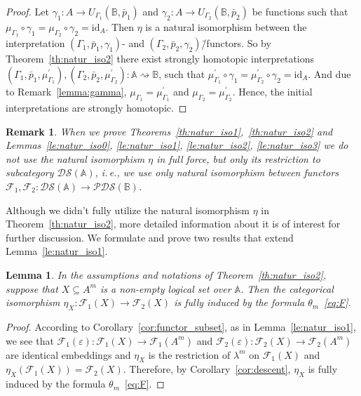 \documentclass[12pt]{article}
\newtheorem{lemma}{Lemma}
\newtheorem{remark}{Remark}
\theoremstyle{definition}
\def\MA{{\mathbb{A}}}
\def\MB{{\mathbb{B}}}
\def\F{{\mathcal{F}}}
\def\PDS{{\mathcal{PDS}}}
\def\DS{{\mathcal{DS}}}
\def\id{{\mathrm{id}}}
\begin{document}
\begin{proof}
Let $\gamma_1\colon A\to U_{\Gamma_1}(\MB,\bar p_1)$ and $\gamma_2\colon A\to U_{\Gamma_2}(\MB,\bar p_2)$ be functions such that $\mu_{\Gamma_1}\circ\gamma_1=\mu_{\Gamma_2}\circ\gamma_2=\id_A$. Then $\eta$ is a natural isomorphism between the interpretation $(\Gamma_1,\bar p_1,\gamma_1)$- and $(\Gamma_2,\bar p_2,\gamma_2)$\=/functors. So by Theorem~\ref{th:natur_iso2} there exist strongly homotopic interpretations $(\Gamma_1,\bar p_1,\mu^\prime_{\Gamma_1}),(\Gamma_2,\bar p_2,\mu^\prime_{\Gamma_2})\colon \MA \rightsquigarrow \MB$, such that $\mu^\prime_{\Gamma_1} \circ\gamma_1=\mu^\prime_{\Gamma_2} \circ\gamma_2=\id_A$. And due to  Remark~\ref{lemma:gamma}, $\mu_{\Gamma_1}=\mu^\prime_{\Gamma_1}$ and $\mu_{\Gamma_2}=\mu^\prime_{\Gamma_2}$. Hence, the initial interpretations are strongly homotopic.  
\end{proof}

\begin{remark}\label{remark:DS}
When we prove Theorems~\ref{th:natur_iso1},~\ref{th:natur_iso2} and Lemmas~\ref{le:natur_iso0}, \ref{le:natur_iso1}, \ref{le:natur_iso2}, \ref{le:natur_iso3} we do not use the natural isomorphism $\eta$ in full force, but only its restriction to subcategory $\DS(\MA)$, i.\,e., we use only natural isomorphism between functors $\F_1,\F_2\colon \DS(\MA)\to\PDS(\MB)$.
\end{remark}

Although we didn't fully utilize the natural isomorphism $\eta$ in Theorem~\ref{th:natur_iso2}, more detailed information about it is of interest for further discussion. We formulate and prove two results that extend Lemma~\ref{le:natur_iso1}.

\begin{lemma}\label{le:natur_iso4}
In the assumptions and notations of Theorem~\ref{th:natur_iso2}, suppose that $X\subseteq A^m$ is a non-empty logical set over $\MA$. Then the categorical isomorphism $\eta_X\colon \F_1(X)\to \F_2(X)$ is fully induced by the formula $\theta_m$~\eqref{eq:F}.
\end{lemma}

\begin{proof}
According to Corollary~\ref{cor:functor_subset}, as in Lemma~\ref{le:natur_iso1}, we see that $\F_1(\varepsilon)\colon \F_1(X)\to \F_1(A^m)$ and $\F_2(\varepsilon)\colon \F_2(X)\to \F_2(A^m)$ are identical embeddings and 
 $\eta_X$ is the restriction of $\lambda^m$ on $\F_1(X)$ and $\eta_X(\F_1(X))=\F_2(X)$. Therefore, by Corollary~\ref{cor:descent}, $\eta_X$ is fully induced by the formula $\theta_m$~\eqref{eq:F}.  
\end{proof}
\end{document}
